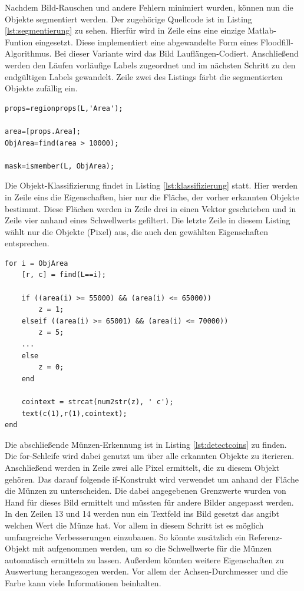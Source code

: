 \documentclass[a4paper,DIV=calc,ngerman]{scrartcl}
\begin{document}
Nachdem Bild-Rauschen und andere Fehlern minimiert wurden, können nun die Objekte segmentiert werden. Der zugehörige Quellcode ist in Listing \ref{lst:segmentierung} zu sehen. Hierfür wird in Zeile eins eine einzige Matlab-Funtion eingesetzt. Diese implementiert eine abgewandelte Form eines Floodfill-Algorithmus. Bei dieser Variante wird das Bild Lauflängen-Codiert.\cite{1} Anschließend werden den Läufen vorläufige Labels zugeordnet und im nächsten Schritt zu den endgültigen Labels gewandelt. Zeile zwei des Listings färbt die segmentierten Objekte zufällig ein.


\begin{lstlisting}[frame=single, caption={Objekt-Klassifizierung}, label={lst:klassifizierung}]
props=regionprops(L,'Area');

area=[props.Area];
ObjArea=find(area > 10000);

mask=ismember(L, ObjArea);
\end{lstlisting}
Die Objekt-Klassifizierung findet in Listing \ref{lst:klassifizierung} statt. Hier werden in Zeile eins die Eigenschaften, hier nur die Fläche, der vorher erkannten Objekte bestimmt. Diese Flächen werden in Zeile drei in einen Vektor geschrieben und in Zeile vier anhand eines Schwellwerts gefiltert. Die letzte Zeile in diesem Listing wählt nur die Objekte (Pixel) aus, die auch den gewählten Eigenschaften entsprechen. 

\begin{lstlisting}[frame=single, caption={Münzen-Erkennung}, label={lst:detectcoins}]
for i = ObjArea
    [r, c] = find(L==i);
    
    if ((area(i) >= 55000) && (area(i) <= 65000))
        z = 1;
    elseif ((area(i) >= 65001) && (area(i) <= 70000))
        z = 5;
    ...
    else
        z = 0;
    end

    cointext = strcat(num2str(z), ' c');
    text(c(1),r(1),cointext);
end
\end{lstlisting}

Die abschließende Münzen-Erkennung ist in Listing \ref{lst:detectcoins} zu finden. Die for-Schleife wird dabei genutzt um über alle erkannten Objekte zu iterieren. Anschließend werden in Zeile zwei alle Pixel ermittelt, die zu diesem Objekt gehören. Das darauf folgende if-Konstrukt wird verwendet um anhand der Fläche die Münzen zu unterscheiden. Die dabei angegebenen Grenzwerte wurden von Hand für dieses Bild ermittelt und müssten für andere Bilder angepasst werden. In den Zeilen 13 und 14 werden nun ein Textfeld ins Bild gesetzt das angibt welchen Wert die Münze hat. Vor allem in diesem Schritt ist es möglich umfangreiche Verbesserungen einzubauen. So könnte zusätzlich ein Referenz-Objekt mit aufgenommen werden, um so die Schwellwerte für die Münzen automatisch ermitteln zu lassen. Außerdem könnten weitere Eigenschaften zu Auswertung herangezogen werden. Vor allem der Achsen-Durchmesser und die Farbe kann viele Informationen beinhalten.
\end{document}
